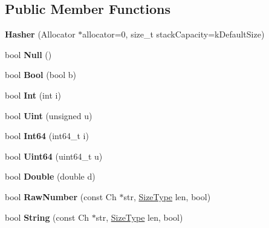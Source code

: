 \subsection*{Public Member Functions}
\begin{DoxyCompactItemize}
\item 
{\bfseries Hasher} (Allocator $\ast$allocator=0, size\+\_\+t stack\+Capacity=k\+Default\+Size)\hypertarget{a00139_a7b6abfdd3bdc60064a2322cdd20708c1}{}\label{a00139_a7b6abfdd3bdc60064a2322cdd20708c1}

\item 
bool {\bfseries Null} ()\hypertarget{a00139_a57c656866aa08cc7c448ce47b7a243c3}{}\label{a00139_a57c656866aa08cc7c448ce47b7a243c3}

\item 
bool {\bfseries Bool} (bool b)\hypertarget{a00139_a11efd784a4e9c4f8a3dc281552df0486}{}\label{a00139_a11efd784a4e9c4f8a3dc281552df0486}

\item 
bool {\bfseries Int} (int i)\hypertarget{a00139_aadbadf98ee7c9ab03a636e0f06d38bac}{}\label{a00139_aadbadf98ee7c9ab03a636e0f06d38bac}

\item 
bool {\bfseries Uint} (unsigned u)\hypertarget{a00139_a4401600c24c817a45cea6c281438e5b4}{}\label{a00139_a4401600c24c817a45cea6c281438e5b4}

\item 
bool {\bfseries Int64} (int64\+\_\+t i)\hypertarget{a00139_ae0579cd54b3c545f77452543793b9a97}{}\label{a00139_ae0579cd54b3c545f77452543793b9a97}

\item 
bool {\bfseries Uint64} (uint64\+\_\+t u)\hypertarget{a00139_a14832ac4ec204f1065b929df2c255457}{}\label{a00139_a14832ac4ec204f1065b929df2c255457}

\item 
bool {\bfseries Double} (double d)\hypertarget{a00139_a83abe847e24ed88d5aab092d840e37c1}{}\label{a00139_a83abe847e24ed88d5aab092d840e37c1}

\item 
bool {\bfseries Raw\+Number} (const Ch $\ast$str, \hyperlink{a00677_a5ed6e6e67250fadbd041127e6386dcb5}{Size\+Type} len, bool)\hypertarget{a00139_ae277289ad2fb3a938a6507e566d3c5e2}{}\label{a00139_ae277289ad2fb3a938a6507e566d3c5e2}

\item 
bool {\bfseries String} (const Ch $\ast$str, \hyperlink{a00677_a5ed6e6e67250fadbd041127e6386dcb5}{Size\+Type} len, bool)\hypertarget{a00139_a885f2bf42f2bb64d6f9443129dce3883}{}\label{a00139_a885f2bf42f2bb64d6f9443129dce3883}


\end{DoxyCompactItemize}
